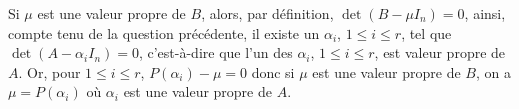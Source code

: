 {\begin{enumerate}
{Si $\mu$ est une valeur propre de $B$, alors, par d\'efinition, $\det(B-\mu I_n)=0$, ainsi, compte tenu de la question pr\'ec\'edente, il existe un $\alpha_i$, $1\leq i\leq r$, tel que $\det(A-\alpha_iI_n)=0$, c'est-\`a-dire que l'un des $\alpha_i$, $1\leq i\leq r$, est valeur propre de $A$. Or, pour $1\leq i\leq r$, $P(\alpha_i)-\mu=0$ donc si $\mu$ est une valeur propre de $B$, on a $\mu=P(\alpha_i)$ o\`u $\alpha_i$ est une valeur propre de $A$.}
\end{enumerate}
}
